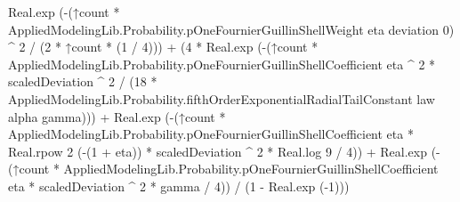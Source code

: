 \documentclass[10pt]{article}
\begin{document}
\begin{ReviewVerbatim}
                                Real.exp
                                  (-(↑count *
                                          AppliedModelingLib.Probability.pOneFournierGuillinShellWeight eta deviation
                                            0) ^
                                        2 /
                                    (2 * ↑count * (1 / 4))) +
                              (4 *
                                    Real.exp
                                      (-(↑count *
                                              AppliedModelingLib.Probability.pOneFournierGuillinShellCoefficient eta ^
                                                2 *
                                            scaledDeviation ^ 2 /
                                          (18 *
                                            AppliedModelingLib.Probability.fifthOrderExponentialRadialTailConstant law
                                              alpha gamma))) +
                                  Real.exp
                                    (-(↑count * AppliedModelingLib.Probability.pOneFournierGuillinShellCoefficient eta *
                                              Real.rpow 2 (-(1 + eta)) *
                                            scaledDeviation ^ 2 *
                                          Real.log 9 /
                                        4)) +
                                Real.exp
                                    (-(↑count * AppliedModelingLib.Probability.pOneFournierGuillinShellCoefficient eta *
                                            scaledDeviation ^ 2 *
                                          gamma /
                                        4)) /
                                  (1 - Real.exp (-1)))
\end{ReviewVerbatim}
\end{document}
